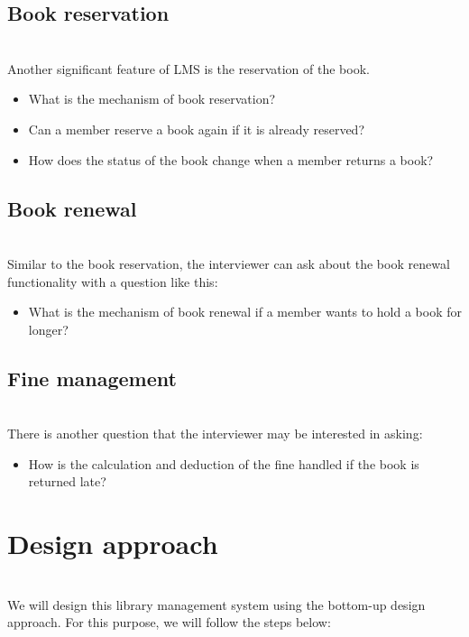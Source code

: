 \subsection{Book reservation}\label{book-reservation}
\\
Another significant feature of LMS is the reservation of the book.

\begin{itemize}
\tightlist
\item
What is the mechanism of book reservation?
\item
Can a member reserve a book again if it is already reserved?
\item
How does the status of the book change when a member returns a book?
\end{itemize}

\subsection{Book renewal}\label{book-renewal}
\\
Similar to the book reservation, the interviewer can ask about the book renewal functionality with a question like this:

\begin{itemize}
\tightlist
\item
What is the mechanism of book renewal if a member wants to hold a book for longer?
\end{itemize}

\subsection{Fine management}\label{fine-management}
\\
There is another question that the interviewer may be interested in asking:

\begin{itemize}
\tightlist
\item
How is the calculation and deduction of the fine handled if the book is returned late?
\end{itemize}

\section{Design approach}\label{design-approach}
\\
We will design this library management system using the bottom-up design approach. For this purpose, we will follow the steps below:

